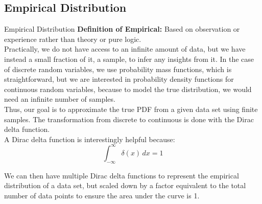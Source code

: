 \subsection{Empirical Distribution}
\begin{intuitbox}{Empirical Distribution}
    \textbf{Definition of Empirical:} Based on observation or experience rather than theory or pure logic.\\

    Practically, we do not have access to an infinite amount of data, but we have instead a small fraction of it, a sample, to infer any insights from it. In the case of discrete random variables, we use probability mass functions, which is straightforward, but we are interested in probability density functions for continuous random variables, because to model the true distribution, we would need an infinite number of samples.\\

    Thus, our goal is to approximate the true PDF from a given data set using finite samples. The transformation from discrete to continuous is done with the Dirac delta function.\\

    A Dirac delta function is interestingly helpful because:
    \[
    \int_{-\infty}^{\infty} \delta(x) \, dx = 1
    \]

    We can then have multiple Dirac delta functions to represent the empirical distribution of a data set, but scaled down by a factor equivalent to the total number of data points to ensure the area under the curve is 1.\\


\end{intuitbox}
